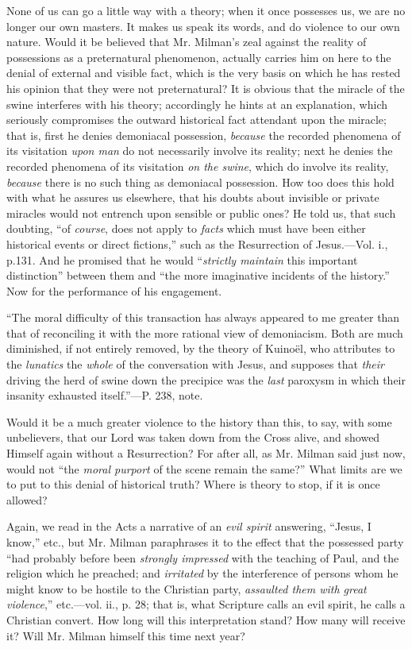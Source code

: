 None of us can go a little way with a theory;
when it once possesses us, we are no longer our own masters. It makes
us speak its words, and do violence to our own nature. Would it be
believed that Mr. Milman's zeal against the reality of possessions as
a preternatural phenomenon, actually carries him on here to the denial
of external and visible fact, which is the very basis on which
he has rested his opinion that they were not preternatural? It is
obvious that the miracle of the swine interferes with his theory;
accordingly he hints at an explanation, which seriously compromises
the outward historical fact attendant upon the miracle; that is, first
he denies demoniacal possession, \emph{because} the recorded phenomena
of its visitation \emph{upon man} do not necessarily involve its
reality; next he denies the recorded phenomena of its visitation \emph{on
the swine}, which do involve its reality, \emph{because} there is
no such thing as demoniacal possession. How too does this hold with
what he assures us elsewhere, that his doubts about invisible or
private miracles would not entrench upon sensible or public ones? He
told us, that such doubting, ``of \emph{course}, does not apply to \emph{facts}
which must have been either historical events or direct fictions,''
such as the Resurrection of Jesus.—Vol. i., p.131. And he promised
that he would ``\emph{strictly maintain} this important distinction''
between them and ``the more imaginative incidents of the history.'' Now
for the performance of his engagement.

``The
moral difficulty of this transaction has always appeared to me greater
than that of reconciling it with the more rational view of demoniacism.
Both are much diminished, if not entirely removed, by the theory of
Kuinoël, who attributes to the \emph{lunatics} the \emph{whole} of
the conversation with Jesus, and supposes that \emph{their} driving
the herd of swine down the precipice was the \emph{last} paroxysm in
which their insanity exhausted itself.''—P. 238, note.

Would it be a much greater violence to the
history than this, to say, with some unbelievers, that our Lord was
taken down from the Cross alive, and showed Himself again without a
Resurrection? For after all, as Mr. Milman said just now, would not ``the
\emph{moral purport} of the scene remain the same?'' What limits are we
to put to this denial of historical truth? Where is theory to
stop, if it is once allowed?

Again, we read in the Acts a narrative of an \emph{evil
spirit} answering, ``Jesus, I know,'' etc., but Mr. Milman
paraphrases it to the effect that the possessed party ``had probably
before been \emph{strongly impressed} with the teaching of Paul, and
the religion which he preached; and \emph{irritated} by the
interference of persons whom he might know to be hostile to the
Christian party, \emph{assaulted them with great violence},''
etc.—vol. ii., p. 28; that is, what Scripture calls an evil spirit,
he calls a Christian convert. How long will this interpretation stand?
How many will receive it? Will Mr. Milman himself this time next year?

